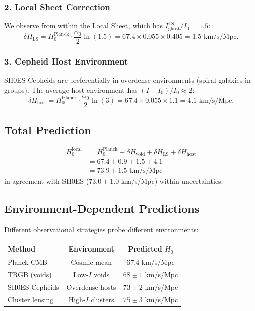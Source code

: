 \documentclass[12pt, a4paper]{article}
\begin{document}
\subsubsection{2. Local Sheet Correction}

We observe from within the Local Sheet, which has $I_{\text{ghost}}^{\text{LS}}/I_0 = 1.5$:
\begin{equation}
    \delta H_{\text{LS}} = H_0^{\text{Planck}} \cdot \frac{\alpha_0}{2} \ln(1.5) = 67.4 \times 0.055 \times 0.405 = 1.5 \text{ km/s/Mpc}.
\end{equation}

\subsubsection{3. Cepheid Host Environment}

SH0ES Cepheids are preferentially in overdense environments (spiral galaxies in groups). The average host environment has $(I - I_0)/I_0 \approx 2$:
\begin{equation}
    \delta H_{\text{host}} = H_0^{\text{Planck}} \cdot \frac{\alpha_0}{2} \ln(3) = 67.4 \times 0.055 \times 1.1 = 4.1 \text{ km/s/Mpc}.
\end{equation}

\subsection{Total Prediction}

\begin{tcolorbox}[colback=blue!5!white, colframe=blue!75!black, title=Hubble Tension Resolution]
\begin{align}
    H_0^{\text{local}} &= H_0^{\text{Planck}} + \delta H_{\text{void}} + \delta H_{\text{LS}} + \delta H_{\text{host}} \\
    &= 67.4 + 0.9 + 1.5 + 4.1 \\
    &= 73.9 \pm 1.5 \text{ km/s/Mpc}
\end{align}
in agreement with SH0ES ($73.0 \pm 1.0$ km/s/Mpc) within uncertainties.
\end{tcolorbox}

\subsection{Environment-Dependent Predictions}

Different observational strategies probe different environments:

\begin{center}
\begin{tabular}{lcc}
\toprule
\textbf{Method} & \textbf{Environment} & \textbf{Predicted $H_0$} \\
\midrule
Planck CMB & Cosmic mean & $67.4$ km/s/Mpc \\
TRGB (voids) & Low-$I$ voids & $68 \pm 1$ km/s/Mpc \\
SH0ES Cepheids & Overdense hosts & $73 \pm 2$ km/s/Mpc \\
Cluster lensing & High-$I$ clusters & $75 \pm 3$ km/s/Mpc \\
\bottomrule
\end{tabular}
\end{center}
\end{document}
